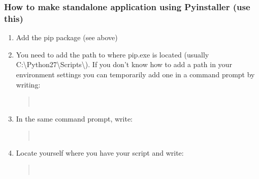 \documentclass[letterpaper,10pt,english]{sphinxmanual}
\begin{document}
\subsubsection{How to make standalone application using Pyinstaller (use this)}
\label{\detokenize{DevelopmentGuidelines:how-to-make-standalone-application-using-pyinstaller-use-this}}\begin{enumerate}
\item {} 
Add the pip package (see above)

\item {} 
You need to add the path to where pip.exe is located (usually
C:\textbackslash{}Python27\textbackslash{}Scripts\textbackslash{}). If you don’t know how to add a path in your
environment settings you can temporarily add one in a command prompt
by writing:
\begin{quote}

%
\begin{sphinxVerbatim}[commandchars=\\\{\}]
 \PYGZbs{}
\end{sphinxVerbatim}
\end{quote}

\item {} 
In the same command prompt, write:
\begin{quote}

%
\begin{sphinxVerbatim}[commandchars=\\\{\}]
  
\end{sphinxVerbatim}
\end{quote}

\item {} 
Locate yourself where you have your script and write:
\begin{quote}

%
\begin{sphinxVerbatim}[commandchars=\\\{\}]
 
\end{sphinxVerbatim}
\end{quote}

\end{enumerate}
\end{document}
